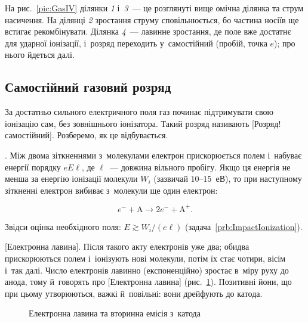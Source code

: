 На рис.~\ref{pic:GasIV} ділянки \emph{1} і~\emph{3}~--- це розглянуті вище омічна
ділянка та струм насичення. На ділянці \emph{2} зростання струму сповільнюється, бо
частина носіїв ще встигає рекомбінувати. Ділянка \emph{4}~--- лавинне зростання, де поле
вже достатнє для ударної іонізації, і~розряд переходить у~самостійний (пробій, точка $e$);
про нього йдеться далі.


\subsection*{Самостійний газовий розряд}


За достатньо сильного електричного поля газ починає підтримувати свою іонізацію сам, без
зовнішнього іонізатора. Такий розряд називають [Розряд!самостійний]. Розберемо, як це
відбувається.

. Між двома зіткненнями з~молекулами електрон прискорюється полем
і~набуває енергії порядку $eE\ell$, де $\ell$~--- довжина вільного пробігу. Якщо ця
енергія не менша за енергію іонізації молекули $W_i$ (зазвичай $10$--$15$~еВ), то при
наступному зіткненні електрон вибиває з~молекули ще один електрон:

\begin{equation*}
	e^-+\mathrm{A}\longrightarrow 2e^-+\mathrm{A}^+.
\end{equation*}

Звідси оцінка необхідного поля: $E\gtrsim W_i/(e\ell)$
(задача~\ref{prb:ImpactIonization}).

[Електронна лавина]. Після такого акту електронів уже два; обидва прискорюються
полем і~іонізують нові молекули, потім їх стає чотири, вісім і~так далі. Число електронів
лавинно (експоненційно) зростає в~міру руху до анода, тому й~говорять про
[Електронна лавина] (рис.~\ref{pic:Avalanche}). Позитивні йони, що при цьому
утворюються, важкі й~повільні: вони дрейфують до катода.

\begin{figure}[h!]\centering
	\caption{Електронна лавина та вторинна емісія з~катода\label{pic:Avalanche}}
\end{figure}

